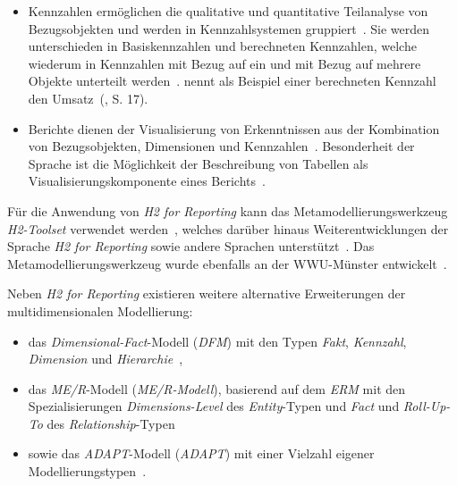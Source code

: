 \documentclass[
  language=german, %
  type=bachelor%
]{isthesis}
\begin{document}
\begin{content}
\begin{itemize}
		\item Kennzahlen ermöglichen die qualitative und quantitative Teilanalyse
		von Bezugsobjekten und werden in Kennzahlsystemen
		gruppiert~\cite[][S.88]{becker2012fachkonzeptionelle}. Sie werden
		unterschieden in Basiskennzahlen und berechneten Kennzahlen, welche
		wiederum in Kennzahlen mit Bezug auf ein und mit Bezug auf mehrere Objekte
		unterteilt werden~\cite[][S.  15]{becker2007h2}.
		\textsc{\citeauthor{becker2007h2}} nennt als Beispiel einer berechneten
		Kennzahl den Umsatz~(\cite{becker2007h2}, S. 17).

		\item Berichte dienen der Visualisierung von Erkenntnissen aus der
		Kombination von Bezugsobjekten, Dimensionen und Kennzahlen~\cite[][S.
		23]{becker2007h2}. Besonderheit der Sprache ist die Möglichkeit der
		Beschreibung von Tabellen als Visualisierungskomponente eines
		Berichts~\cite[][S. 86]{becker2012fachkonzeptionelle}.

	\end{itemize}

	Für die Anwendung von \textit{H2 for Reporting} kann das
	Metamodellierungswerkzeug \textit{H2-Toolset} verwendet werden~\cite[][S.
	33]{fleischer2013konstruktion}, welches darüber hinaus Weiterentwicklungen
	der Sprache \textit{H2 for Reporting} sowie andere Sprachen
	unterstützt~\cite[][S. 86]{becker2012fachkonzeptionelle}. Das
	Metamodellierungswerkzeug wurde ebenfalls an der \acrshort{WWU}-Münster
	entwickelt~\cite[][S.  34]{becker2007h2}.

  Neben \textit{H2 for Reporting} existieren weitere alternative Erweiterungen der multidimensionalen Modellierung:

  \begin{itemize}
    \item das \textit{Dimensional-Fact}-Modell (\textit{\acrshort{DFM}}) mit den Typen
      \textit{Fakt}, \textit{Kennzahl}, \textit{Dimension} und
      \textit{Hierarchie}~\cite[][]{golfarelli1998dimensional}, 
    \item das \textit{\acrlong{ME/R}}-Modell (\textit{\acrshort{ME/R}-Modell}), basierend
      auf dem \textit{\acrlong{ERM}} mit den Spezialisierungen
      \textit{Dimensions-Level} des \textit{Entity}-Typen und \textit{Fact} und
      \textit{Roll-Up-To} des
      \textit{Relationship}-Typen~\cite[][]{sapia1998extending}
    \item sowie das
      \textit{\acrlong{ADAPT}}-Modell (\textit{\acrshort{ADAPT}}) mit einer
      Vielzahl eigener Modellierungstypen~\cite[][]{chamoni2013analytische}.
  \end{itemize}


\end{content}
\end{document}
